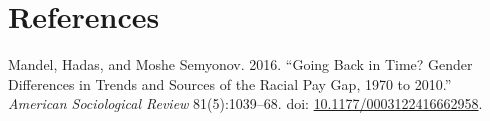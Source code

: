 \documentclass[
  12,
]{article}
\newlength{\cslhangindent}
\newenvironment{CSLReferences}[2] %
 {\begin{list}{}{%
  \setlength{\itemindent}{0pt}
  \setlength{\leftmargin}{0pt}
  \setlength{\parsep}{0pt}
  \ifodd #1
   \setlength{\leftmargin}{\cslhangindent}
   \setlength{\itemindent}{-1\cslhangindent}
  \fi
  \setlength{\itemsep}{#2\baselineskip}}}
 {\end{list}}
\begin{document}
\section*{References}\label{bibliography}

\label{refs}
\begin{CSLReferences}{1}{1}
Mandel, Hadas, and Moshe Semyonov. 2016. {``Going {Back} in {Time}?
{Gender} {Differences} in {Trends} and {Sources} of the {Racial} {Pay}
{Gap}, 1970 to 2010.''} \emph{American Sociological Review}
81(5):1039--68. doi:
\href{https://doi.org/10.1177/0003122416662958}{10.1177/0003122416662958}.

\end{CSLReferences}
\end{document}
